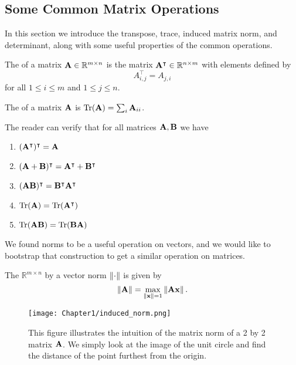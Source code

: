 \subsection{Some Common Matrix Operations} 

In this section we introduce the transpose, trace, induced matrix norm, and determinant, along with some useful properties of the common operations.

\begin{definition}\label{trans-def}
The  of a matrix $\MA \in \mathbb R^{m \times n}$ is the matrix $\MA^\intercal \in \mathbb R^{n\times m}$ with elements defined by 
$$A^\intercal_{i,j} = A_{j,i}$$ 
for all $1\leq i\leq m$ and $1\leq j\leq n$.
\end{definition}

\begin{definition}
The  of a matrix $\MA$ is $\trace(\MA) = \sum_i \MA_{ii}$.
\end{definition}

The reader can verify that for all matrices $\MA,\MB$ we have
\begin{enumerate}
    \item $(\MA^\intercal)^\intercal = \MA$
    \item $(\MA + \MB)^\intercal = \MA^\intercal + \MB^\intercal$
    \item $(\MA\MB)^\intercal = \MB^\intercal \MA^\intercal$
    \item $\trace(\MA) = \trace(\MA^\intercal)$
    \item $\trace(\MA\MB) = \trace(\MB\MA)$
\end{enumerate}

We found norms to be a useful operation on vectors, and we would like to bootstrap that construction to get a similar operation on matrices.

\begin{definition}
The  $\mathbb R^{m \times n}$ by a vector norm $\norm{\cdot}$ is given by 
$$\norm{\MA} = \max_{\norm{\vx} = 1} \norm{\MA\vx}.$$
\end{definition}

\begin{figure}
\centering
  \texttt{[image: Chapter1/induced\_norm.png]}
  \caption{This figure illustrates the intuition of the matrix norm of a 2 by 2 matrix $\MA$. We simply look at the image of the unit circle and find the distance of the point furthest from the origin.}
\end{figure}

